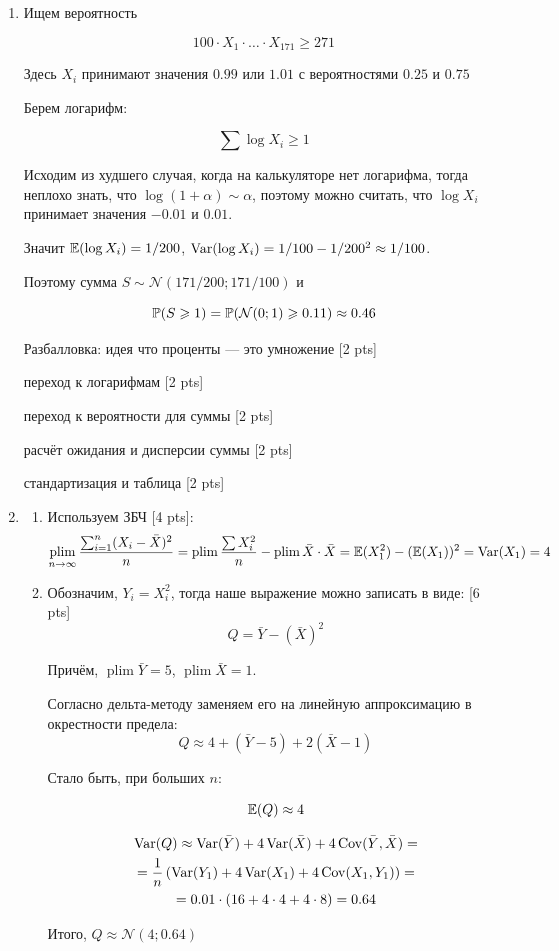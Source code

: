 \documentclass[12pt, a4paper]{article}\usepackage[]{graphicx}\usepackage[]{color}
\DeclareMathOperator*\plim{plim}
\newcommand{\cN}{\mathcal{N}}
\begin{document}
\begin{enumerate}
\item

Ищем вероятность

\[
100\cdot X_1 \cdot \ldots \cdot X_{171} \geq 271
\]

Здесь $X_i$ принимают значения $0.99$ или $1.01$ с вероятностями $0.25$ и $0.75$

Берем логарифм:

\[
\sum \log X_i \geq 1
\]

Исходим из худшего случая, когда на калькуляторе нет логарифма, тогда неплохо знать, что $\log (1+\alpha) \sim \alpha$, поэтому можно считать, что $\log X_i$ принимает значения $-0.01$ и $0.01$.

Значит $\mathbb{E}(\log X_i)=1/200$, $\operatorname{Var}(\log X_i)=1/100 - 1/200^2 \approx 1/100$.

Поэтому сумма $S \sim \cN(171/200; 171/100)$ и

\[
\P(S \geq 1)=\P(\cN(0;1) \geq 0.11) \approx 0.46
\]

Разбалловка: идея что проценты — это умножение [2 pts]

переход к логарифмам [2 pts]

переход к вероятности для суммы [2 pts]

расчёт ожидания и дисперсии суммы [2 pts]

стандартизация и таблица [2 pts]


\item
\begin{enumerate}
\item Используем ЗБЧ [4 pts]:
\[
\plim_{n \to \infty} \frac{\sum_{i=1}^n (X_i - \bar{X})^2}{n} = \plim \frac{\sum X_i^2}{n} - \plim \bar X \cdot \bar X = \E(X_1^2) - (\E(X_1))^2 = \Var(X_1) = 4
\]
\item Обозначим, $Y_i=X_i^2$, тогда наше выражение можно записать в виде: [6 pts]
\[
Q=\bar Y - (\bar X)^2
\]

Причём, $\plim \bar Y = 5$, $\plim \bar X = 1$.

Согласно дельта-методу заменяем его на линейную аппроксимацию в окрестности предела:
\[
Q\approx 4 + (\bar Y - 5) + 2 (\bar X - 1)
\]

Стало быть, при больших $n$:

\[
\mathbb{E}(Q) \approx 4
\]

\begin{multline}
\operatorname{Var}(Q) \approx \operatorname{Var}(\bar Y) + 4\operatorname{Var}(\bar X) + 4\operatorname{Cov}(\bar Y, \bar X) =\\
= \frac{1}{n} \left(\operatorname{Var}(Y_1) + 4 \operatorname{Var}(X_1) + 4\operatorname{Cov}(X_1, Y_1) \right) = \\
= 0.01 \cdot (16 + 4 \cdot 4 + 4 \cdot 8)= 0.64
\end{multline}

Итого, $Q \approx \cN(4; 0.64)$

\end{enumerate}

\end{enumerate}
\end{document}
